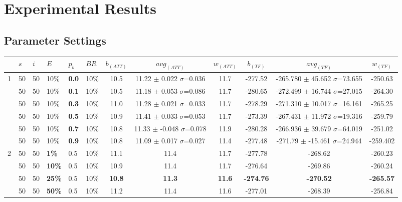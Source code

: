 \chapter{Experimental Results}
\label{appendixC}

\section{Parameter Settings}

\begin{sidewaystable}
    \hspace*{-0.5cm}
    \begin{tabular}{|l|l|l|l|l|l||c|c|c|c|c|c|}
    \hline
    ~ & $s$ & $i$ & $E$ & $p_{b}$ & $BR$ & $b_{(ATT)}$ & $avg_{(ATT)}$ & $w_{(ATT)}$ & $b_{(TF)}$ & $avg_{(TF)}$ & $w_{(TF)}$ \\
    \hline
    1 & 50 & 50 & 10\% & \textbf{0.0} & 10\% & 10.5 & 11.22 $\pm$ 0.022 $\sigma$=0.036 & 11.7 & -277.52 & -265.780 $\pm$ 45.652 $\sigma$=73.655 & -250.63 \\
    ~ & 50 & 50 & 10\% & \textbf{0.1} & 10\% & 10.5 & 11.18 $\pm$ 0.053 $\sigma$=0.086 & 11.7 & -280.65 & -272.499 $\pm$ 16.744 $\sigma$=27.015 & -264.30 \\
    ~ & 50 & 50 & 10\% & \textbf{0.3} & 10\% & 11.0 & 11.28 $\pm$ 0.021 $\sigma$=0.033 & 11.7 & -278.29 & -271.310 $\pm$ 10.017 $\sigma$=16.161 & -265.25 \\
    ~ & 50 & 50 & 10\% & \textbf{0.5} & 10\% & 10.9 & 11.41 $\pm$ 0.033 $\sigma$=0.053 & 11.7 & -273.39 & -267.431 $\pm$ 11.972 $\sigma$=19.316 & -259.79\\
    ~ & 50 & 50 & 10\% & \textbf{0.7} & 10\% & 10.8 & 11.33 $\pm$ -0.048 $\sigma$=0.078 & 11.9 & -280.28 & -266.936 $\pm$ 39.679 $\sigma$=64.019 & -251.02\\
    ~ & 50 & 50 & 10\% & \textbf{0.9} & 10\% & 10.8 & 11.09 $\pm$ 0.017 $\sigma$=0.027 & 11.4 & -277.48 & -271.79 $\pm$ -15.461 $\sigma$=24.944 & -259.402 \\
    \hline
    2 & 50 & 50 & \textbf{1\%} & 0.5 & 10\% & 11.1 & 11.4 & 11.7 & -277.78 & -268.62 & -260.23 \\
    ~ & 50 & 50 & \textbf{10\%} & 0.5 & 10\% & 10.9 & 11.4 & 11.7 & -276.64 & -269.86 & -260.24 \\
    ~ & 50 & 50 & \textbf{25\%} & 0.5 & 10\% &  \textbf{10.8} & \textbf{11.3} & \textbf{11.6} & \textbf{-274.76} & \textbf{-270.52} & \textbf{-265.57} \\
    ~ & 50 & 50 & \textbf{50\%} & 0.5 & 10\% &  11.2 & 11.4 & 11.6 & -277.01 & -268.39 & -256.84 \\

\end{tabular}
\end{sidewaystable}
